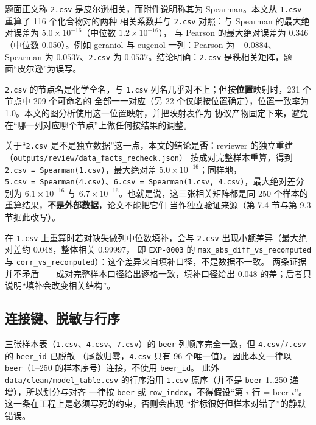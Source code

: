 \documentclass[
  a4paper,12pt]{article}
\begin{document}
题面正文称 \texttt{2.csv} 是皮尔逊相关，而附件说明称其为
Spearman。本文从 \texttt{1.csv} 重算了 116 个化合物对的两种 相关系数并与
\texttt{2.csv} 对照：与 Spearman 的最大绝对误差为
\(5.0\times10^{-16}\)（中位数 \(1.2\times10^{-16}\)）， 与 Pearson
的最大绝对误差为 0.346（中位数 0.050）。例如 geraniol 与 eugenol
一列：Pearson 为 \(-0.0884\)、 Spearman 为 \(0.0537\)、\texttt{2.csv} 为
\(0.0537\)。结论明确：\texttt{2.csv}
是秩相关矩阵，题面``皮尔逊''为误写。

\texttt{2.csv} 的节点名是化学全名，与 \texttt{1.csv}
列名几乎对不上；但按\textbf{位置}映射时，231 个节点中 209 个可命名的
全部一一对应（另 22 个仅能按位置确定），位置一致率为
1.0。本文的图分析使用这一位置映射，并把映射表作为
协议产物固定下来，避免在``哪一列对应哪个节点''上做任何按结果的调整。

关于``\texttt{2.csv}
是不是独立数据''这一点，本文的结论是\textbf{否}：reviewer
的独立重建（\texttt{outputs/review/data\_facts\_recheck.json}）
按成对完整样本重算，得到 \texttt{2.csv\ =\ Spearman(1.csv)}，最大绝对差
\(5.0\times10^{-16}\)；同样地，
\texttt{5.csv\ =\ Spearman(4.csv)}、\texttt{6.csv\ =\ Spearman(1.csv,\ 4.csv)}，最大绝对差分别为
\(6.1\times10^{-16}\) 与
\(6.7\times10^{-16}\)。也就是说，这三张相关矩阵都是同 250
个样本的重算结果，\textbf{不是外部数据}，论文不能把它们
当作独立验证来源（第 7.4 节与第 9.3 节据此改写）。

在 \texttt{1.csv} 上重算时若对缺失做列中位数填补，会与 \texttt{2.csv}
出现小额差异（最大绝对差约 0.048，整体相关 0.99997， 即
\texttt{EXP-0003} 的 \texttt{max\_abs\_diff\_vs\_recomputed} 与
\texttt{corr\_vs\_recomputed}）：这个差异来自填补口径，不是数据不一致。
两条证据并不矛盾------成对完整样本口径给出逐格一致，填补口径给出 0.048
的差；后者只说明``填补会改变相关结构''。

\subsection{连接键、脱敏与行序}\label{ux8fdeux63a5ux952eux8131ux654fux4e0eux884cux5e8f}

三张样本表（\texttt{1.csv}、\texttt{4.csv}、\texttt{7.csv}）的
\texttt{beer} 列顺序完全一致，但 \texttt{4.csv}/\texttt{7.csv} 的
\texttt{beer\_id} 已脱敏 （尾数归零，\texttt{4.csv} 只有 96
个唯一值）。因此本文一律以 \texttt{beer}（1--250
的样本序号）连接，不使用 \texttt{beer\_id}。 此外
\texttt{data/clean/model\_table.csv} 的行序沿用 \texttt{1.csv}
原序（并不是 \texttt{beer} 1..250 递增），所以划分与对齐 一律按
\texttt{beer} 或 \texttt{row\_index}，不得假设``第 \(i\) 行 = beer
\(i\)''。这一条在工程上是必须写死的约束，否则会出现
``指标很好但样本对错了''的静默错误。
\end{document}
